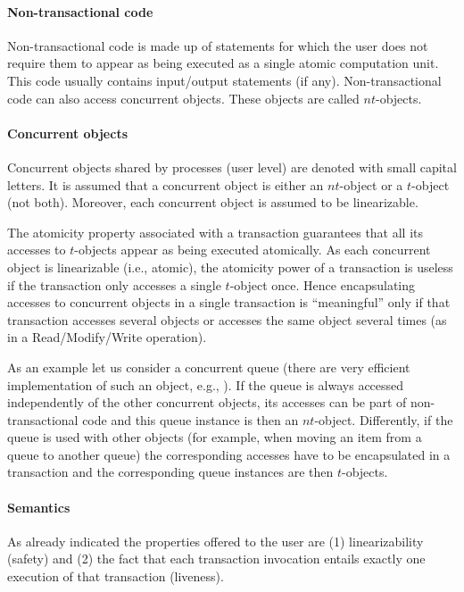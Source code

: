 \paragraph{Non-transactional code}
Non-transactional code is made up of statements for which the user does not
require  them to appear  as being  executed  as  a single  atomic computation
unit. This code usually contains input/output statements (if any). 
Non-transactional code can also access concurrent objects.  
These objects are called $nt$-objects.  

\paragraph{Concurrent objects}
Concurrent objects shared by processes (user level) are denoted with
small capital letters. It is assumed that  a concurrent object is either 
an  $nt$-object  or a  $t$-object (not both). Moreover, each 
concurrent object is assumed to be linearizable. 

The atomicity property associated with a transaction guarantees 
that all its accesses to $t$-objects appear as being executed atomically. 
As each concurrent object is linearizable (i.e., atomic), 
the atomicity power of a transaction is useless if the transaction only 
accesses  a single  $t$-object once. Hence encapsulating accesses to
concurrent objects in a single transaction is ``meaningful'' only 
if that transaction   accesses several objects or accesses the same object
several times (as in a Read/Modify/Write operation).  

As an example let us consider a concurrent queue (there are very 
efficient implementation of such an object, e.g., \cite{MS96}). 
If the queue is always  accessed independently of the other concurrent 
objects,  its accesses can be part of non-transactional code and 
this queue instance is  then an $nt$-object. 
Differently,  if the queue is used with other objects
(for example, when  moving an item from a queue to another queue) the 
corresponding accesses  have to  be encapsulated in  a transaction  and the
corresponding queue instances are then  $t$-objects. 

\paragraph{Semantics}
As already indicated the properties offered to the user are
(1)  linearizability  (safety) and 
(2) the fact that each transaction invocation entails  exactly one
execution of that transaction (liveness). 



